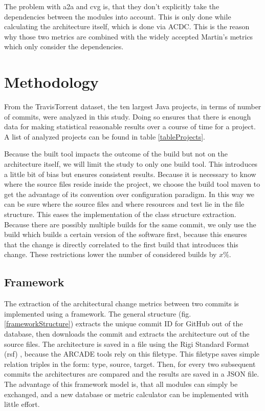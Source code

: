 \documentclass[conference]{IEEEtran}
\begin{document}
The problem with a2a and cvg is, that they don't explicitly take the dependencies between the modules into account. This is only done while calculating the architecture itself, which is done via ACDC. This is the reason why those two metrics are combined with the widely accepted Martin's metrics which only consider the dependencies.

\section{Methodology}

From the TravisTorrent dataset, the ten largest Java projects, in terms of number of commits, were analyzed in this study. Doing so ensures that there is enough data for making statistical reasonable results over a course of time for a project. A list of analyzed projects can be found in table \ref{tableProjects}.

Because the built tool impacts the outcome of the build but not on the architecture itself, we will limit the study to only one build tool. This introduces a little bit of bias but ensures consistent results. Because it is necessary to know where the source files reside inside the project, we choose the build tool maven to get the advantage of its convention over configuration paradigm. In this way we can be sure where the source files and where resources and test lie in the file structure. This eases the implementation of the class structure extraction. 
Because there are possibly multiple builds for the same commit, we only use the build which builds a certain version of the software first, because this ensures that the change is directly correlated to the first build that introduces this change. These restrictions lower the number of considered builds by $x\%$. 

\subsection{Framework}

The extraction of the architectural change metrics between two commits is implemented using a framework. The general structure (fig. \ref{frameworkStructure}) extracts the unique commit ID for GitHub out of the database, then downloads the commit and extracts the architecture out of the source files. The architecture is saved in a file using the Rigi Standard Format (rsf) \cite{RSF}, because the ARCADE tools rely on this filetype. This filetype saves simple relation triples in the form: type, source, target. Then, for every two subsequent commits the architectures are compared and the results are saved in a JSON file. The advantage of this framework model is, that all modules can simply be exchanged, and a new database or metric calculator can be implemented with little effort.
\end{document}
